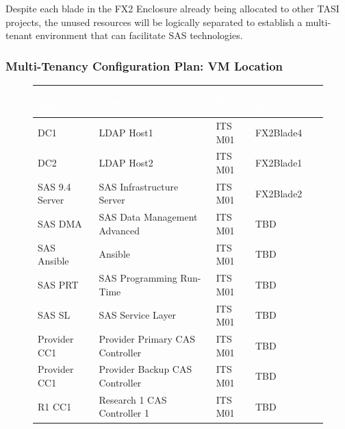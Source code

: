 Despite each blade in the FX2 Enclosure already being allocated to other TASI projects, the unused resources will be logically separated to establish a multi-tenant environment that can facilitate SAS technologies.

\newpage 

\subsubsection{Multi-Tenancy Configuration Plan: VM Location}
\label{Multi-Tenancy Configuration Plan}

\begin{figure}[H]
\begin{center}
    \renewcommand{\arraystretch}{1.5}
    \begin{tabular}{|>{\raggedright\arraybackslash}l 
                    |>{\raggedright\arraybackslash}m{6cm} 
                    |>{\raggedright\arraybackslash}l 
                    |>{\raggedright\arraybackslash}l 
                    |}
    \hline
    \rowcolor[HTML]{196fb4}\centering\textcolor{white}{\large Server Name} 
                            & \centering\textcolor{white}{\large Function}  
                            & \centering\textcolor{white}{\large Site} 
                            & \centering\textcolor{white}{\large Physical Server} 
                            \tabularnewline 
    \hline
    DC1	           & LDAP Host1                         & ITS M01 & FX2Blade4 \\\hline
    DC2	           & LDAP Host2                         & ITS M01 & FX2Blade1 \\\hline
    SAS 9.4 Server & SAS Infrastructure Server          & ITS M01 & FX2Blade2 \\\hline
    SAS DMA	       & SAS Data Management Advanced       & ITS M01 & TBD	\\\hline
    SAS Ansible	   & Ansible	                        & ITS M01 & TBD	\\\hline
    SAS PRT	       & SAS Programming Run-Time	        & ITS M01 & TBD	\\\hline
    SAS SL	       & SAS Service Layer	                & ITS M01 & TBD	\\\hline
    Provider CC1   & Provider Primary CAS Controller    & ITS M01 & TBD	\\\hline
    Provider CC1   & Provider Backup CAS Controller     & ITS M01 & TBD	\\\hline
    R1 CC1	       & Research 1 CAS Controller 1	    & ITS M01 & TBD	\\\hline

\end{tabular}
\end{center}
\end{figure}
